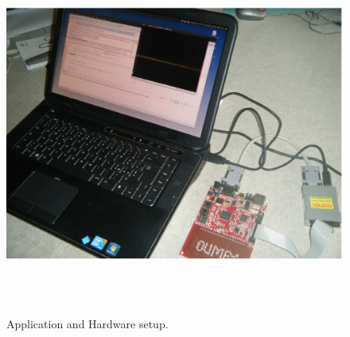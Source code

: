 \documentclass[a4paper,10pt]{article}
\begin{document}
\begin{multicols}{2}
\begin{figure}[t]
	\centering
	\includegraphics[width=16cm, height=12cm]{./eps/DSCF2211}
	\caption{Application and Hardware setup.}
	\label{fig:myfigure5}
\end{figure}


%


\end{multicols}
\end{document}
